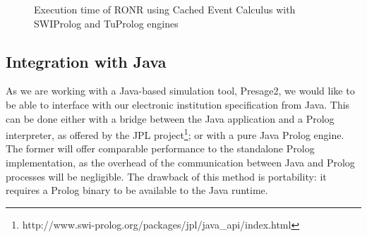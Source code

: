 \begin{figure}
\centering
{}
\caption{Execution time of RONR using Cached Event Calculus with SWIProlog and
TuProlog engines}\label{fig:cec}
\end{figure}

\subsection{Integration with Java}

As we are working with a Java-based simulation tool, Presage2, we would like
to be able to interface with our electronic institution specification from
Java. This can be done either with a bridge between the Java application and a
Prolog interpreter, as offered by the JPL project\footnote{http://www.swi-prolog.org/packages/jpl/java\_api/index.html}; or with a pure Java Prolog
engine. The former will offer comparable performance to the standalone Prolog
implementation, as the overhead of the communication between Java and Prolog
processes will be negligible. The drawback of this method is portability: it
requires a Prolog binary to be available to the Java runtime.

